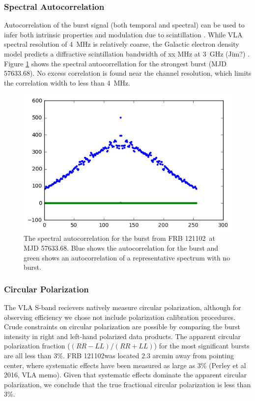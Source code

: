 \documentclass[twocolumn]{aastex61}
\newcommand{\frb}{FRB 121102}
\begin{document}


\subsubsection{Spectral Autocorrelation}
\label{sec:auto}
Autocorrelation of the burst signal (both temporal and spectral) can be used to infer both intrinsic properties and modulation due to scintillation \citep{CORDES}. While VLA spectral resolution of 4~MHz is relatively coarse, the Galactic electron density model predicts a diffractive scintillation bandwidth of {\color{red} xx MHz at 3~GHz (Jim?)} \citep{2002astro.ph..7156C}. Figure \ref{fig:acf} shows the spectral autocorrellation for the strongest burst (MJD 57633.68). No excess correlation is found near the channel resolution, which limits the correlation width to less than 4~MHz.

\begin{figure}[htb]
\begin{center}
\includegraphics[width=0.9\columnwidth]{acf_57633_scan7}
\caption{The spectral autocorrelation for the burst from \frb\ at MJD 57633.68. Blue shows the autocorrelation for the burst and green shows an autocorrelation of a representative spectrum with no burst.
\label{fig:acf}}
\end{center}
\end{figure}

\subsubsection{Circular Polarization}
The VLA S-band recievers natively measure circular polarization, although for observing efficiency we chose not include polarization calibration procedures. Crude constraints on circular polarization are possible by comparing the burst intensity in right and left-hand polarized data products. The apparent circular polarization fraction ($(RR-LL)/(RR+LL)$) for the most significant bursts are all less than 3\%. \frb was located 2.3 arcmin away from pointing center, where systematic effects have been measured as large as 3\% (Perley et al 2016, VLA memo). Given that systematic effects dominate the apparent circular polarization, we conclude that the true fractional circular polarization is less than 3\%.
\end{document}
